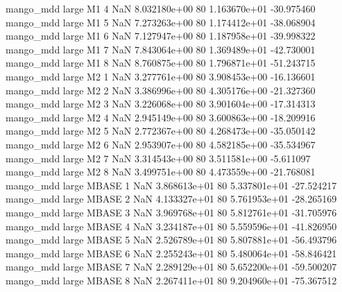         mango_mdd      large       M1                 4                  NaN 8.032180e+00 80   1.163670e+01         -30.975460
        mango_mdd      large       M1                 5                  NaN 7.273263e+00 80   1.174412e+01         -38.068904
        mango_mdd      large       M1                 6                  NaN 7.127947e+00 80   1.187958e+01         -39.998322
        mango_mdd      large       M1                 7                  NaN 7.843064e+00 80   1.369489e+01         -42.730001
        mango_mdd      large       M1                 8                  NaN 8.760875e+00 80   1.796871e+01         -51.243715
        mango_mdd      large       M2                 1                  NaN 3.277761e+00 80   3.908453e+00         -16.136601
        mango_mdd      large       M2                 2                  NaN 3.386996e+00 80   4.305176e+00         -21.327360
        mango_mdd      large       M2                 3                  NaN 3.226068e+00 80   3.901604e+00         -17.314313
        mango_mdd      large       M2                 4                  NaN 2.945149e+00 80   3.600863e+00         -18.209916
        mango_mdd      large       M2                 5                  NaN 2.772367e+00 80   4.268473e+00         -35.050142
        mango_mdd      large       M2                 6                  NaN 2.953907e+00 80   4.582185e+00         -35.534967
        mango_mdd      large       M2                 7                  NaN 3.314543e+00 80   3.511581e+00          -5.611097
        mango_mdd      large       M2                 8                  NaN 3.499751e+00 80   4.473559e+00         -21.768081
        mango_mdd      large    MBASE                 1                  NaN 3.868613e+01 80   5.337801e+01         -27.524217
        mango_mdd      large    MBASE                 2                  NaN 4.133327e+01 80   5.761953e+01         -28.265169
        mango_mdd      large    MBASE                 3                  NaN 3.969768e+01 80   5.812761e+01         -31.705976
        mango_mdd      large    MBASE                 4                  NaN 3.234187e+01 80   5.559596e+01         -41.826950
        mango_mdd      large    MBASE                 5                  NaN 2.526789e+01 80   5.807881e+01         -56.493796
        mango_mdd      large    MBASE                 6                  NaN 2.255243e+01 80   5.480064e+01         -58.846421
        mango_mdd      large    MBASE                 7                  NaN 2.289129e+01 80   5.652200e+01         -59.500207
        mango_mdd      large    MBASE                 8                  NaN 2.267411e+01 80   9.204960e+01         -75.367512
